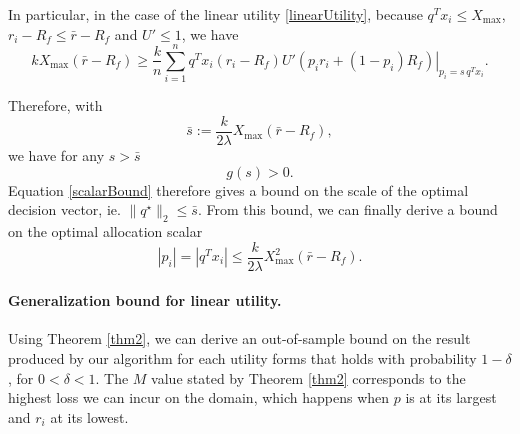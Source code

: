In particular, in the case of the linear utility \eqref{linearUtility}, because
$q^Tx_i\leq X_{\max}$, $r_i-R_f\leq \bar r - R_f$ and $U'\leq 1$, we have
\begin{equation*}
 k X_{\max}(\bar{r}-R_f) \geq \frac{k}{n} \sum_{i=1}^n q^{T}x_i (r_i-R_f) \left. U'(p_i r_i +
    (1-p_i)R_f) \right|_{p_i = s\,q^{T}x_i}.
\end{equation*}

Therefore, with
\begin{equation}
  \label{scalarBound}
  \bar s := \frac{k}{2\lambda}X_{\max}(\bar r-R_f),
\end{equation}
we have for any $s>\bar s$
\begin{equation*}
  g(s) > 0.
\end{equation*}
Equation \eqref{scalarBound} therefore gives a bound on the scale of the optimal
decision vector, ie. $\|q^\star\|_2 \leq \bar s$. From this bound, we can finally derive a
bound on the optimal allocation scalar
\begin{equation}
  \label{allocationBound}
  |p_i| = |q^{T}x_i|\leq \frac{k}{2\lambda} X^2_{\max}(\bar r -R_f).
\end{equation}

\paragraph{Generalization bound for linear utility.}
Using Theorem \ref{thm2}, we can derive an out-of-sample bound on the result produced by
our algorithm for each utility forms that holds with probability $1-\delta$, for
$0<\delta<1$. The $M$ value stated by Theorem \ref{thm2} corresponds to the highest loss
we can incur on the domain, which happens when $p$ is at its largest and $r_i$ at its
lowest.

